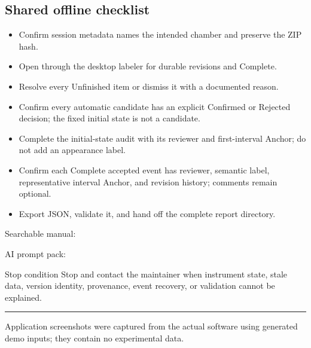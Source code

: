\documentclass[10pt,a4paper]{article}
\newcommand{\checkitem}[1]{\item[$\square$] #1}
\begin{document}
\subsection{Shared offline checklist}
\begin{itemize}
  \checkitem{Confirm session metadata names the intended chamber and preserve the ZIP hash.}
  \checkitem{Open through the desktop labeler for durable revisions and Complete.}
  \checkitem{Resolve every Unfinished item or dismiss it with a documented reason.}
  \checkitem{Confirm every automatic candidate has an explicit Confirmed or Rejected decision; the fixed initial state is not a candidate.}
  \checkitem{Complete the initial-state audit with its reviewer and first-interval Anchor; do not add an appearance label.}
  \checkitem{Confirm each Complete accepted event has reviewer, semantic label, representative interval Anchor, and revision history; comments remain optional.}
  \checkitem{Export JSON, validate it, and hand off the complete report directory.}
\end{itemize}

Searchable manual: \par
AI prompt pack: \par

\begin{dangerbox}{Stop condition}
Stop and contact the maintainer when instrument state, stale data, version identity, provenance, event recovery, or validation cannot be explained.
\end{dangerbox}

\vfill
\hrule
\vspace{2mm}
{\small\color{ManualMuted}Application screenshots were captured from the actual software using generated demo inputs; they contain no experimental data.}
\end{document}
